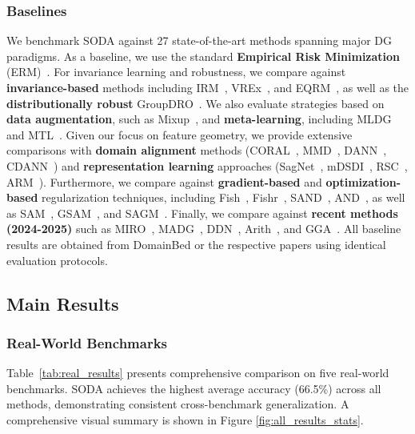 \documentclass[preprint,12pt]{elsarticle}
\begin{document}
\subsubsection{Baselines}
\begin{sloppypar} 
We benchmark SODA against 27 state-of-the-art methods spanning major DG paradigms. As a baseline, we use the standard \textbf{Empirical Risk Minimization} (ERM)~\citep{vapnik1999nature}. For invariance learning and robustness, we compare against \textbf{invariance-based} methods including IRM~\citep{arjovsky2019invariant}, VREx~\citep{krueger2021out}, and EQRM~\citep{eastwood2022probable}, as well as the \textbf{distributionally robust} GroupDRO~\citep{sagawa2019distributionally}. We also evaluate strategies based on \textbf{data augmentation}, such as Mixup~\citep{zhang2018mixup}, and \textbf{meta-learning}, including MLDG~\citep{li2018learning_meta} and MTL~\citep{blanchard2021domain}. Given our focus on feature geometry, we provide extensive comparisons with \textbf{domain alignment} methods (CORAL~\citep{sun2016deep}, MMD~\citep{li2018domain_mmd}, DANN~\citep{ganin2016domain}, CDANN~\citep{li2018deep_cdann}) and \textbf{representation learning} approaches (SagNet~\citep{nam2021reducing}, mDSDI~\citep{bui2021exploiting}, RSC~\citep{huang2020self}, ARM~\citep{zhang2021adaptive}). Furthermore, we compare against \textbf{gradient-based} and \textbf{optimization-based} regularization techniques, including Fish~\citep{shi2022gradient}, Fishr~\citep{rame2022fishr}, SAND~\citep{shahtalebi2021sandmask}, AND~\citep{park2021andmask}, as well as SAM~\citep{foret2021sharpness}, GSAM~\citep{zhuang2022surrogate}, and SAGM~\citep{wang2023sharpness}. Finally, we compare against \textbf{recent methods (2024-2025)} such as MIRO~\citep{cha2022domain}, MADG~\citep{madg2023}, DDN~\citep{zhang2023aggregation}, Arith~\citep{Wang2025BalancedDF}, and GGA~\citep{gga2025}. All baseline results are obtained from DomainBed or the respective papers using identical evaluation protocols.
\end{sloppypar} 
\subsection{Main Results}
\label{ssec:main_results}

\subsubsection{Real-World Benchmarks}

Table~\ref{tab:real_results} presents comprehensive comparison on five real-world benchmarks. SODA achieves the highest average accuracy (66.5\%) across all methods, demonstrating consistent cross-benchmark generalization. A comprehensive visual summary is shown in Figure \ref{fig:all_results_stats}.
\end{document}
